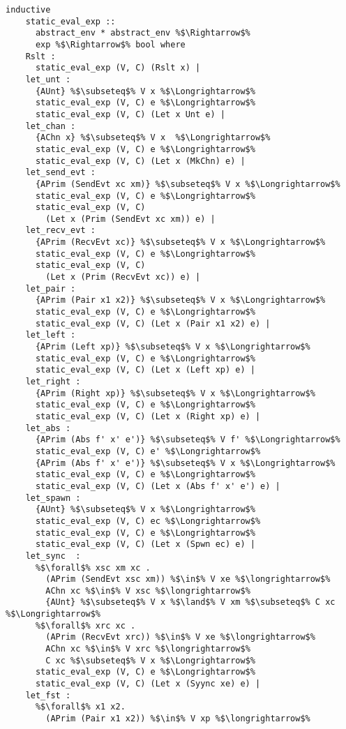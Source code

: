 \documentclass{article}
\begin{document}
\begin{lstlisting}[style=codestyle1, escapechar=\%]
  inductive
    static_eval_exp ::
      abstract_env * abstract_env %$\Rightarrow$%
      exp %$\Rightarrow$% bool where
    Rslt :
      static_eval_exp (V, C) (Rslt x) |
    let_unt :
      {AUnt} %$\subseteq$% V x %$\Longrightarrow$%
      static_eval_exp (V, C) e %$\Longrightarrow$% 
      static_eval_exp (V, C) (Let x Unt e) |
    let_chan : 
      {AChn x} %$\subseteq$% V x  %$\Longrightarrow$%
      static_eval_exp (V, C) e %$\Longrightarrow$%
      static_eval_exp (V, C) (Let x (MkChn) e) |
    let_send_evt : 
      {APrim (SendEvt xc xm)} %$\subseteq$% V x %$\Longrightarrow$%
      static_eval_exp (V, C) e %$\Longrightarrow$% 
      static_eval_exp (V, C)
        (Let x (Prim (SendEvt xc xm)) e) |
    let_recv_evt :
      {APrim (RecvEvt xc)} %$\subseteq$% V x %$\Longrightarrow$%
      static_eval_exp (V, C) e %$\Longrightarrow$% 
      static_eval_exp (V, C)
        (Let x (Prim (RecvEvt xc)) e) |
    let_pair : 
      {APrim (Pair x1 x2)} %$\subseteq$% V x %$\Longrightarrow$%
      static_eval_exp (V, C) e %$\Longrightarrow$% 
      static_eval_exp (V, C) (Let x (Pair x1 x2) e) |
    let_left : 
      {APrim (Left xp)} %$\subseteq$% V x %$\Longrightarrow$%
      static_eval_exp (V, C) e %$\Longrightarrow$% 
      static_eval_exp (V, C) (Let x (Left xp) e) |
    let_right :
      {APrim (Right xp)} %$\subseteq$% V x %$\Longrightarrow$%
      static_eval_exp (V, C) e %$\Longrightarrow$% 
      static_eval_exp (V, C) (Let x (Right xp) e) |
    let_abs : 
      {APrim (Abs f' x' e')} %$\subseteq$% V f' %$\Longrightarrow$%
      static_eval_exp (V, C) e' %$\Longrightarrow$%
      {APrim (Abs f' x' e')} %$\subseteq$% V x %$\Longrightarrow$%
      static_eval_exp (V, C) e %$\Longrightarrow$% 
      static_eval_exp (V, C) (Let x (Abs f' x' e') e) |
    let_spawn :
      {AUnt} %$\subseteq$% V x %$\Longrightarrow$%
      static_eval_exp (V, C) ec %$\Longrightarrow$% 
      static_eval_exp (V, C) e %$\Longrightarrow$%  
      static_eval_exp (V, C) (Let x (Spwn ec) e) |
    let_sync  : 
      %$\forall$% xsc xm xc . 
        (APrim (SendEvt xsc xm)) %$\in$% V xe %$\longrightarrow$% 
        AChn xc %$\in$% V xsc %$\longrightarrow$%
        {AUnt} %$\subseteq$% V x %$\land$% V xm %$\subseteq$% C xc %$\Longrightarrow$%
      %$\forall$% xrc xc . 
        (APrim (RecvEvt xrc)) %$\in$% V xe %$\longrightarrow$%
        AChn xc %$\in$% V xrc %$\longrightarrow$%
        C xc %$\subseteq$% V x %$\Longrightarrow$%
      static_eval_exp (V, C) e %$\Longrightarrow$%  
      static_eval_exp (V, C) (Let x (Syync xe) e) |
    let_fst : 
      %$\forall$% x1 x2.
        (APrim (Pair x1 x2)) %$\in$% V xp %$\longrightarrow$%

\end{lstlisting}
\end{document}
